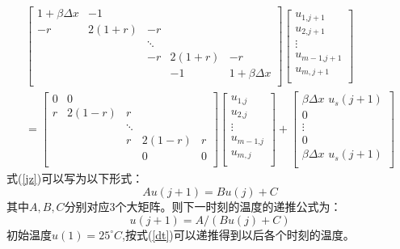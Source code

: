 \documentclass[withoutpreface,bwprint]{cumcmthesis} %
\begin{document}
	\begin{equation}\label{jz}
	\begin{gathered}
	\left[ \begin{matrix}
	1+\beta \Delta x&		-1&		&		&		\\
	-r&		2\left( 1+r \right)&		-r&		&		\\
	&		&		\ddots&		&		\\
	&		&		-r&		2\left( 1+r \right)&		-r\\
	&		&		&		-1&		1+\beta \Delta x\\
	\end{matrix} \right] \left[ \begin{array}{c}
	u_{\text{1,}j+1}\\
	u_{\text{2,}j+1}\\
	\vdots\\
	u_{m-\text{1,}j+1}\\
	u_{m,j+1}\\
	\end{array} \right] \\
	=\left[ \begin{matrix}
	0&		0&		&		&		\\
	r&		2\left( 1-r \right)&		r&		&		\\
	&		&		\ddots&		&		\\
	&		&		r&		2\left( 1-r \right)&		r\\
	&		&		&		0&		0\\
	\end{matrix} \right] \left[ \begin{array}{c}
	u_{\text{1,}j}\\
	u_{\text{2,}j}\\
	\vdots\\
	u_{m-\text{1,}j}\\
	u_{m,j}\\
	\end{array} \right] +\left[ \begin{array}{c}
	\beta \Delta x\,\,u_s\left( j+1 \right)\\
	0\\
	\vdots\\
	0\\
	\beta \Delta x\,\,u_s\left( j+1 \right)\\
	\end{array} \right] 
	\end{gathered}
	\end{equation}
	式(\ref{jz})可以写为以下形式：
	\begin{equation}\label{jzhuajian}
	Au\left( j+1 \right) =Bu\left( j \right) +C
	\end{equation}
	其中$A,B,C$分别对应3个大矩阵。则下一时刻的温度的递推公式为：
	\begin{equation}\label{dt}
	u\left( j+1 \right) =A/\left( Bu\left( j \right) +C \right) 
	\end{equation}
	初始温度$u(1)=25^\circ C$,按式(\ref{dt})可以递推得到以后各个时刻的温度。
\end{document}
